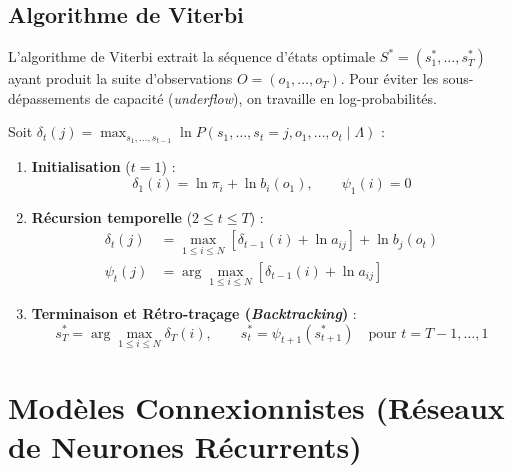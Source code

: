 \subsection{Algorithme de Viterbi}

L'algorithme de Viterbi extrait la séquence d'états optimale $S^* = (s_1^*, \dots, s_T^*)$ ayant produit la suite d'observations $O = (o_1, \dots, o_T)$. Pour éviter les sous-dépassements de capacité (\emph{underflow}), on travaille en log-probabilités.

\begin{theorem}
    Soit $\delta_t(j) = \max_{s_1, \dots, s_{t-1}} \ln P(s_1, \dots, s_t = j, o_1, \dots, o_t \mid \Lambda)$ :
    \begin{enumerate}
        \item \textbf{Initialisation} ($t=1$) :
            \begin{equation}
                \delta_1(i) = \ln \pi_i + \ln b_i(o_1), \qquad \psi_1(i) = 0
            \end{equation}
        \item \textbf{Récursion temporelle} ($2 \leqslant t \leqslant T$) :
            \begin{align}
                \delta_t(j) &= \max_{1 \leqslant i \leqslant N} \left[ \delta_{t-1}(i) + \ln a_{ij} \right] + \ln b_j(o_t) \\
                \psi_t(j) &= \arg\max_{1 \leqslant i \leqslant N} \left[ \delta_{t-1}(i) + \ln a_{ij} \right]
            \end{align}
        \item \textbf{Terminaison et Rétro-traçage (\emph{Backtracking})} :
            \begin{equation}
                s_T^* = \arg\max_{1 \leqslant i \leqslant N} \delta_T(i), \qquad s_t^* = \psi_{t+1}(s_{t+1}^*) \quad \text{pour } t = T-1, \dots, 1
            \end{equation}
    \end{enumerate}
\end{theorem}


\section{Modèles Connexionnistes (Réseaux de Neurones Récurrents)}

